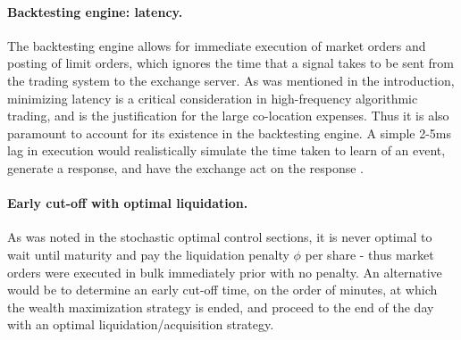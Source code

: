 \paragraph{Backtesting engine: latency.} The backtesting engine allows for immediate execution of market orders and posting of limit orders, which ignores the time that a signal takes to be sent from the trading system to the exchange server. As was mentioned in the introduction, minimizing latency is a critical consideration in high-frequency algorithmic trading, and is the justification for the large co-location expenses. Thus it is also paramount to account for its existence in the backtesting engine. A simple 2-5ms lag in execution would realistically simulate the time taken to learn of an event, generate a response, and have the exchange act on the response \citep{hasbrouck2013low}.

\paragraph{Early cut-off with optimal liquidation.} As was noted in the stochastic optimal control sections, it is never optimal to wait until maturity and pay the liquidation penalty $\phi$ per share - thus market orders were executed in bulk immediately prior with no penalty. An alternative would be to determine an early cut-off time, on the order of minutes, at which the wealth maximization strategy is ended, and proceed to the end of the day with an optimal liquidation/acquisition strategy. 